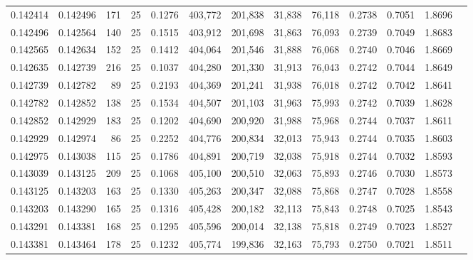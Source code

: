 \begin{tabular}{rrrrrrrrrrrrr}
0.142414 & 0.142496 &   171 &  25 &                                     0.1276 & 403,772 & 201,838 &  31,838 &  76,118 & 0.2738 & 0.7051 & 1.8696 \\
0.142496 & 0.142564 &   140 &  25 &                                     0.1515 & 403,912 & 201,698 &  31,863 &  76,093 & 0.2739 & 0.7049 & 1.8683 \\
0.142565 & 0.142634 &   152 &  25 &                                     0.1412 & 404,064 & 201,546 &  31,888 &  76,068 & 0.2740 & 0.7046 & 1.8669 \\
0.142635 & 0.142739 &   216 &  25 &                                     0.1037 & 404,280 & 201,330 &  31,913 &  76,043 & 0.2742 & 0.7044 & 1.8649 \\
0.142739 & 0.142782 &    89 &  25 &                                     0.2193 & 404,369 & 201,241 &  31,938 &  76,018 & 0.2742 & 0.7042 & 1.8641 \\
0.142782 & 0.142852 &   138 &  25 &                                     0.1534 & 404,507 & 201,103 &  31,963 &  75,993 & 0.2742 & 0.7039 & 1.8628 \\
0.142852 & 0.142929 &   183 &  25 &                                     0.1202 & 404,690 & 200,920 &  31,988 &  75,968 & 0.2744 & 0.7037 & 1.8611 \\
0.142929 & 0.142974 &    86 &  25 &                                     0.2252 & 404,776 & 200,834 &  32,013 &  75,943 & 0.2744 & 0.7035 & 1.8603 \\
0.142975 & 0.143038 &   115 &  25 &                                     0.1786 & 404,891 & 200,719 &  32,038 &  75,918 & 0.2744 & 0.7032 & 1.8593 \\
0.143039 & 0.143125 &   209 &  25 &                                     0.1068 & 405,100 & 200,510 &  32,063 &  75,893 & 0.2746 & 0.7030 & 1.8573 \\
0.143125 & 0.143203 &   163 &  25 &                                     0.1330 & 405,263 & 200,347 &  32,088 &  75,868 & 0.2747 & 0.7028 & 1.8558 \\
0.143203 & 0.143290 &   165 &  25 &                                     0.1316 & 405,428 & 200,182 &  32,113 &  75,843 & 0.2748 & 0.7025 & 1.8543 \\
0.143291 & 0.143381 &   168 &  25 &                                     0.1295 & 405,596 & 200,014 &  32,138 &  75,818 & 0.2749 & 0.7023 & 1.8527 \\
0.143381 & 0.143464 &   178 &  25 &                                     0.1232 & 405,774 & 199,836 &  32,163 &  75,793 & 0.2750 & 0.7021 & 1.8511 \\

\end{tabular}
